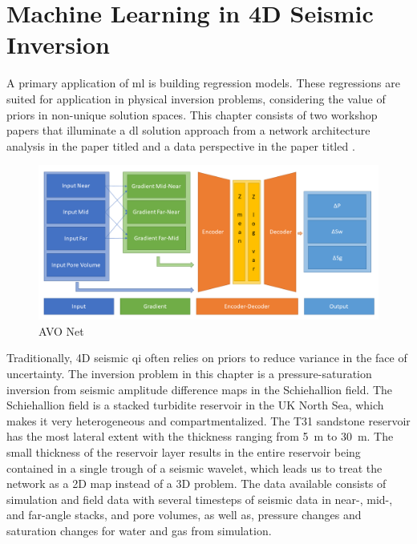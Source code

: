 \section{Machine Learning in 4D Seismic Inversion}

A primary application of \acl{ml} is building regression models. These regressions are suited for application in physical inversion problems, considering the value of priors in non-unique solution spaces. This chapter consists of two workshop papers that illuminate a \ac{dl} solution approach from a network architecture analysis in the paper titled  and a data perspective in the paper titled .

\begin{figure}
    \centering
    \includegraphics[width=\textwidth]{figures/AVO-Net.png}
    \caption{AVO Net}
    \label{fig:avo-net}
\end{figure}


Traditionally, 4D seismic \acf{qi} often relies on priors to reduce variance in the face of uncertainty. The inversion problem in this chapter is a pressure-saturation inversion from seismic amplitude difference maps in the Schiehallion field. The Schiehallion field is a stacked turbidite reservoir in the UK North Sea, which makes it very heterogeneous and compartmentalized. The T31 sandstone reservoir has the most lateral extent with the thickness ranging from 5~m to 30~m. The small thickness of the reservoir layer results in the entire reservoir being contained in a single trough of a seismic wavelet, which leads us to treat the network as a 2D map instead of a 3D problem. The data available consists of simulation and field data with several timesteps of seismic data in near-, mid-, and far-angle stacks, and pore volumes, as well as, pressure changes and saturation changes for water and gas from simulation.

